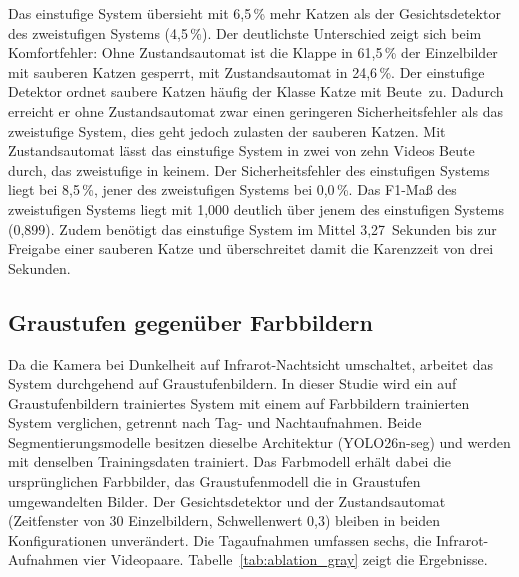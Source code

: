 Das einstufige System übersieht mit 6,5\,\% mehr Katzen als der Gesichtsdetektor des zweistufigen Systems (4,5\,\%). Der deutlichste Unterschied zeigt sich beim Komfortfehler: Ohne Zustandsautomat ist die Klappe in 61,5\,\% der Einzelbilder mit sauberen Katzen gesperrt, mit Zustandsautomat in 24,6\,\%. Der einstufige Detektor ordnet saubere Katzen häufig der Klasse \glqq Katze mit Beute\grqq\ zu. Dadurch erreicht er ohne Zustandsautomat zwar einen geringeren Sicherheitsfehler als das zweistufige System, dies geht jedoch zulasten der sauberen Katzen. Mit Zustandsautomat lässt das einstufige System in zwei von zehn Videos Beute durch, das zweistufige in keinem. Der Sicherheitsfehler des einstufigen Systems liegt bei 8,5\,\%, jener des zweistufigen Systems bei 0,0\,\%. Das F1-Maß des zweistufigen Systems liegt mit 1,000 deutlich über jenem des einstufigen Systems (0,899). Zudem benötigt das einstufige System im Mittel 3,27~Sekunden bis zur Freigabe einer sauberen Katze und überschreitet damit die Karenzzeit von drei Sekunden.

\subsection{Graustufen gegenüber Farbbildern}
Da die Kamera bei Dunkelheit auf Infrarot-Nachtsicht umschaltet, arbeitet das System durchgehend auf Graustufenbildern. In dieser Studie wird ein auf Graustufenbildern trainiertes System mit einem auf Farbbildern trainierten System verglichen, getrennt nach Tag- und Nachtaufnahmen.
Beide Segmentierungsmodelle besitzen dieselbe Architektur (YOLO26n-seg) und werden mit denselben Trainingsdaten trainiert. Das Farbmodell erhält dabei die ursprünglichen Farbbilder, das Graustufenmodell die in Graustufen umgewandelten Bilder. Der Gesichtsdetektor und der Zustandsautomat (Zeitfenster von 30 Einzelbildern, Schwellenwert 0,3) bleiben in beiden Konfigurationen unverändert. Die Tagaufnahmen umfassen sechs, die Infrarot-Aufnahmen vier Videopaare. Tabelle~\ref{tab:ablation_gray} zeigt die Ergebnisse.

